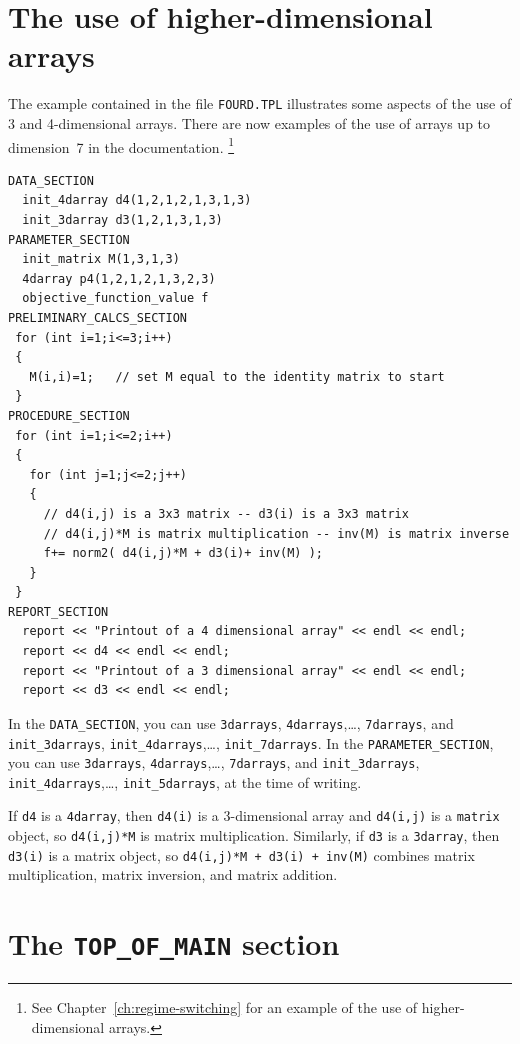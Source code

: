 \documentclass{admbmanual}
\newcommand\DS{\texttt{DATA\_SECTION}}
\newcommand\PS{\texttt{PARAMETER\_SECTION}}
\begin{document}
\section{The use of higher-dimensional arrays}

The example contained in the file \texttt{FOURD.TPL} illustrates some aspects of
the use of 3 and 4-dimensional arrays. There are now examples of the use of
arrays up to dimension~7 in the documentation. \footnote{See
  Chapter~\ref{ch:regime-switching} for an example of the use of
  higher-dimensional arrays.}
\begin{lstlisting}
DATA_SECTION
  init_4darray d4(1,2,1,2,1,3,1,3)
  init_3darray d3(1,2,1,3,1,3)
PARAMETER_SECTION
  init_matrix M(1,3,1,3)
  4darray p4(1,2,1,2,1,3,2,3)
  objective_function_value f
PRELIMINARY_CALCS_SECTION
 for (int i=1;i<=3;i++)
 {
   M(i,i)=1;   // set M equal to the identity matrix to start
 }
PROCEDURE_SECTION
 for (int i=1;i<=2;i++)
 {
   for (int j=1;j<=2;j++)
   {
     // d4(i,j) is a 3x3 matrix -- d3(i) is a 3x3 matrix
     // d4(i,j)*M is matrix multiplication -- inv(M) is matrix inverse
     f+= norm2( d4(i,j)*M + d3(i)+ inv(M) );
   }
 }
REPORT_SECTION
  report << "Printout of a 4 dimensional array" << endl << endl;
  report << d4 << endl << endl;
  report << "Printout of a 3 dimensional array" << endl << endl;
  report << d3 << endl << endl;
\end{lstlisting}
In the \DS, you can use \texttt{3darrays}, \texttt{4darrays},\ldots,
\texttt{7darrays}, and \texttt{init\_3darrays}, \texttt{init\_4darrays},\ldots,
\texttt{init\_7darrays}. In the \PS, you can use \texttt{3darrays},
\texttt{4darrays},\ldots, \texttt{7darrays}, and \texttt{init\_3darrays},
\texttt{init\_4darrays},\ldots, \texttt{init\_5darrays}, at the time of writing.

If \texttt{d4} is a \texttt{4darray}, then \texttt{d4(i)} is a 3-dimensional
array and \texttt{d4(i,j)} is a \texttt{matrix} object, so \texttt{d4(i,j)*M} is
matrix multiplication. Similarly, if \texttt{d3} is a \texttt{3darray}, then
\texttt{d3(i)} is a matrix object, so \texttt{d4(i,j)*M + d3(i) + inv(M)}
combines matrix multiplication, matrix inversion, and matrix addition.


\section{The \texttt{TOP\_OF\_MAIN} section}
\end{document}
